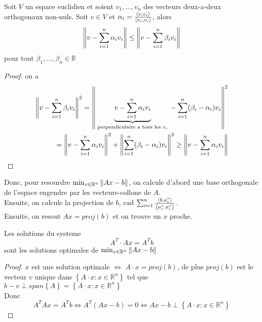 \documentclass[../main.tex]{subfiles}
\begin{document}
\begin{thm}
	Soit $V$ un espace euclidien et soient $v_{1}, \ldots,v_n$ des vecteurs deux-a-deux orthogonaux non-nuls. Soit $v \in V$ et $\alpha_i = \frac{\left\langle v,v_i\right\rangle }{\left\langle v_i,v_i\right\rangle}$, alors
	\[ 
\left\lVert v - \sum_{i=1}^{ n}\alpha_i v_i\right\rVert  \leq \left\lVert v - \sum_{i=1}^{ n}\beta_i v_i\right\rVert 
	\]
	pour tout $\beta_1, \ldots,\beta_n \in \mathbb{R}$
\end{thm}
\begin{proof}
on a
\begin{align*}
	\left\lVert v- \sum_{i=1}^{ n}\beta_i v_i\right\rVert ^{2} = \left\lVert \underbrace{v - \sum_{i=1}^{ n}\alpha_i v_i }_{ \text{ perpendiculaire a tous les $v_i$ }}-  \sum_{i=1}^{ n}( \beta_i - \alpha_i) v_i \right\rVert ^{2}\\
	= \left\lVert v - \sum_{i=1}^{ n}\alpha_i v_i\right\rVert ^{2} + \left\lVert \sum_{i=1}^{ n}( \beta_i - \alpha_i) v_i\right\rVert ^{2} \geq \left\lVert v- \sum_{i=1}^{ n}\alpha_i v_i\right\rVert 
\end{align*}

\end{proof}
Donc, pour resourdre $\min_{x\in \mathbb{R}^n} \left\lVert Ax -b\right\rVert $, on calcule d'abord une base orthogonale de l'espace engendre par les vecteurs-collone de $A$.\\
Ensuite, on calcule la projection de $b$, cad $ \sum_{i=1}^{ n} \frac{\left\langle b, a_i^{*}\right\rangle }{\left\langle a_i^{*}, a_i^{*}\right\rangle }$.\\
Ensuite, on resout $Ax = proj( b) $ et on trouve un $x$ proche.
\begin{thm}
Les solutions du systeme 
\[ 
A^{T} \cdot A x = A^{T}b
\]
sont les solutions optimales de $\min_{x\in \mathbb{R}^n} \left\lVert Ax -b\right\rVert $
\end{thm}
\begin{proof}
	$x$ est une solution optimale $\iff$ $A\cdot x = proj( b) $, de plus $proj( b) $ est le vecteur $v$ unique dans $ \left\{ A \cdot x : x \in \mathbb{R}^n \right\} $ tel que $b-v \perp span \left\{ A \right\} = \left\{ A\cdot x : x \in \mathbb{R}^n \right\} $ \\
		Donc
		\[ 
			A^{T}A x = A^{T} b \iff A ^{T} ( Ax-b) = 0 \iff Ax - b \perp  \left\{ A\cdot x : x \in \mathbb{R}^n \right\} 
		\]
		
\end{proof}
\end{document}
